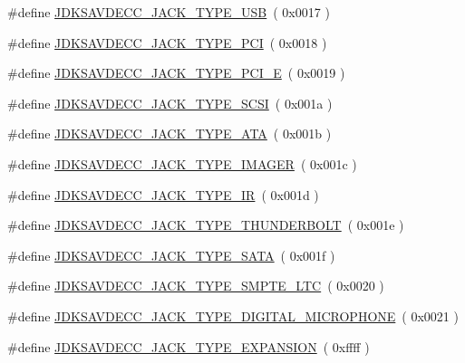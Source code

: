 \begin{DoxyCompactItemize}
\item 
\#define \hyperlink{group__jack__type_ga461d99d5b8754ea66921a182f20ce373}{J\+D\+K\+S\+A\+V\+D\+E\+C\+C\+\_\+\+J\+A\+C\+K\+\_\+\+T\+Y\+P\+E\+\_\+\+U\+SB}~( 0x0017 )
\item 
\#define \hyperlink{group__jack__type_ga9e0d5bfe1a66ec97e9fd8b7bfc85d850}{J\+D\+K\+S\+A\+V\+D\+E\+C\+C\+\_\+\+J\+A\+C\+K\+\_\+\+T\+Y\+P\+E\+\_\+\+P\+CI}~( 0x0018 )
\item 
\#define \hyperlink{group__jack__type_ga7726a71256199601df1936f3f853ada4}{J\+D\+K\+S\+A\+V\+D\+E\+C\+C\+\_\+\+J\+A\+C\+K\+\_\+\+T\+Y\+P\+E\+\_\+\+P\+C\+I\+\_\+E}~( 0x0019 )
\item 
\#define \hyperlink{group__jack__type_gac7e69fd33f5a5b5009acfc81bc6c558b}{J\+D\+K\+S\+A\+V\+D\+E\+C\+C\+\_\+\+J\+A\+C\+K\+\_\+\+T\+Y\+P\+E\+\_\+\+S\+C\+SI}~( 0x001a )
\item 
\#define \hyperlink{group__jack__type_gaaa9a8423b0c5ed0b336b10710c8a37fc}{J\+D\+K\+S\+A\+V\+D\+E\+C\+C\+\_\+\+J\+A\+C\+K\+\_\+\+T\+Y\+P\+E\+\_\+\+A\+TA}~( 0x001b )
\item 
\#define \hyperlink{group__jack__type_gaa13e5b552df719ff6fa4afedfa81860f}{J\+D\+K\+S\+A\+V\+D\+E\+C\+C\+\_\+\+J\+A\+C\+K\+\_\+\+T\+Y\+P\+E\+\_\+\+I\+M\+A\+G\+ER}~( 0x001c )
\item 
\#define \hyperlink{group__jack__type_gac10687d3e384239447adb6fc6cab1a8b}{J\+D\+K\+S\+A\+V\+D\+E\+C\+C\+\_\+\+J\+A\+C\+K\+\_\+\+T\+Y\+P\+E\+\_\+\+IR}~( 0x001d )
\item 
\#define \hyperlink{group__jack__type_gab7f6db7a52dc56b24812d766bb6e6d88}{J\+D\+K\+S\+A\+V\+D\+E\+C\+C\+\_\+\+J\+A\+C\+K\+\_\+\+T\+Y\+P\+E\+\_\+\+T\+H\+U\+N\+D\+E\+R\+B\+O\+LT}~( 0x001e )
\item 
\#define \hyperlink{group__jack__type_ga8834e1a22a852efdd158e2bdd1a26842}{J\+D\+K\+S\+A\+V\+D\+E\+C\+C\+\_\+\+J\+A\+C\+K\+\_\+\+T\+Y\+P\+E\+\_\+\+S\+A\+TA}~( 0x001f )
\item 
\#define \hyperlink{group__jack__type_ga5cd2bbcaef14060e17a81006b2ca014b}{J\+D\+K\+S\+A\+V\+D\+E\+C\+C\+\_\+\+J\+A\+C\+K\+\_\+\+T\+Y\+P\+E\+\_\+\+S\+M\+P\+T\+E\+\_\+\+L\+TC}~( 0x0020 )
\item 
\#define \hyperlink{group__jack__type_ga0136b35d53d3b383a4a36c7cc170d150}{J\+D\+K\+S\+A\+V\+D\+E\+C\+C\+\_\+\+J\+A\+C\+K\+\_\+\+T\+Y\+P\+E\+\_\+\+D\+I\+G\+I\+T\+A\+L\+\_\+\+M\+I\+C\+R\+O\+P\+H\+O\+NE}~( 0x0021 )
\item 
\#define \hyperlink{group__jack__type_ga4f40291653384402c4f972691b736231}{J\+D\+K\+S\+A\+V\+D\+E\+C\+C\+\_\+\+J\+A\+C\+K\+\_\+\+T\+Y\+P\+E\+\_\+\+E\+X\+P\+A\+N\+S\+I\+ON}~( 0xffff )
\end{DoxyCompactItemize}


